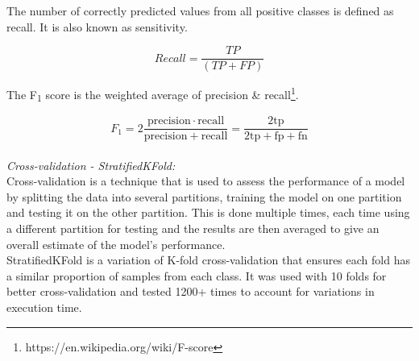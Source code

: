 \documentclass[conference]{IEEEtran}
\begin{document}
	\noindent The number of correctly predicted values from all positive classes is defined as recall. It is also known as sensitivity\cite{C36}.
	
	\begin{equation*}
		Recall = \frac{TP}{(TP + FP)}
	\end{equation*}
	
	\noindent The F\textsubscript{1} score is the weighted average of precision \& recall\footnote{https://en.wikipedia.org/wiki/F-score}.
	
	\begin{equation*}
		{\displaystyle F_{1}=2{\frac {\mathrm {precision} \cdot \mathrm {recall} }{\mathrm {precision} +\mathrm {recall} }}={\frac {2\mathrm {tp} }{2\mathrm {tp} +\mathrm {fp} +\mathrm {fn} }}}
	\end{equation*}
	\\
	\textit{Cross-validation - StratifiedKFold:}\\
	Cross-validation is a technique that is used to assess the performance of a model by splitting the data into several partitions, training the model on one partition and testing it on the other partition\cite{C37}. This is done multiple times, each time using a different partition for testing and the results are then averaged to give an overall estimate of the model's performance\cite{C37}. \\
	StratifiedKFold is a variation of K-fold cross-validation that ensures each fold has a similar proportion of samples from each class. It was used with 10 folds for better cross-validation and tested 1200+ times to account for variations in execution time.
	
\end{document}

